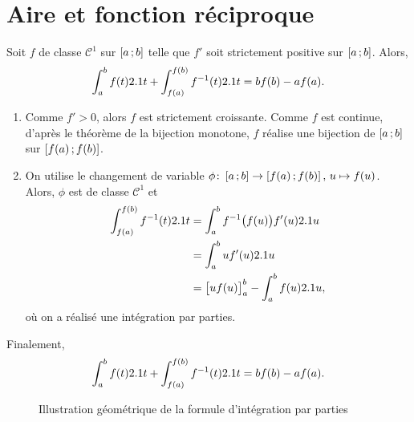 \section{Aire et fonction réciproque}

\begin{prop}
Soit $f$ de classe $\mathscr{C}^1$ sur $\interff{a}{b}$ telle que $f'$ soit strictement positive sur $\interff{a}{b}$. Alors,
\[
\int_{a}^{b} f(t) \d t + \int_{f(a)}^{f(b)} f^{-1}(t) \d t = b f(b) - a f(a).
\]
\end{prop}

\begin{elemsolution}
    \begin{enumerate}
    \item Comme $f' > 0$, alors $f$ est strictement croissante. Comme $f$ est continue, d'après le théorème de la bijection monotone, $f$ réalise une bijection de $\interff{a}{b}$ sur $\interff{f(a)}{f(b)}$.
    
    \item On utilise le changement de variable $\fonctionens[\phi]{\interff{a}{b}}{\interff{f(a)}{f(b)}},\, u \mapsto f(u)$. Alors, $\phi$ est de classe $\mathscr{C}^1$ et
    \begin{align*}
    \int_{f(a)}^{f(b)} f^{-1}(t) \d t
    &= \int_a^b f^{-1}\mathopen{}\big(f(u)\big) f'(u) \d u\\
    &= \int_a^b u f'(u) \d u\\
    &= \big[u f(u)\big]_a^b - \int_a^b f(u) \d u,
    \end{align*}
    où on a réalisé une intégration par parties.
    \end{enumerate}

    Finalement,
    \[
    \int_a^b f(t) \d t + \int_{f(a)}^{f(b)} f^{-1}(t) \d t = b f(b) - a f(a).
    \]
\end{elemsolution}

\begin{figure}[H]
    \centering
    
    \caption{Illustration géométrique de la formule d'intégration par parties}
    \label{fig:i_01-une_propriete_geometrique_de_l_integrale}
\end{figure}

